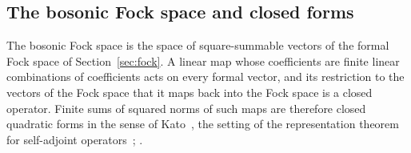 \providecommand{\dom}{\operatorname{dom}}
\providecommand{\form}{\mathfrak q}
\begin{vetbenv}
\section{The bosonic Fock space and closed forms}\label{sec:fockspace}

The bosonic Fock space is the space of square-summable vectors of the formal Fock space of
Section~\ref{sec:fock}. A linear map whose coefficients are finite linear combinations of
coefficients acts on every formal vector, and its restriction to the vectors of the Fock space
that it maps back into the Fock space is a closed operator. Finite sums of squared norms of such
maps are therefore closed quadratic forms in the sense of Kato~\cite[VI\,\S1.3]{kato}, the setting
of the representation theorem for self-adjoint operators~\cite[VI\,\S2]{kato}; .


\end{vetbenv}
